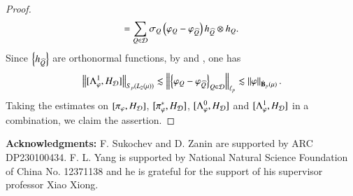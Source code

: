 \documentclass[leqno]{amsart}
\begin{document}
\begin{proof}
\begin{align*}
[\Lambda^{1}_{\varphi},H_{\D}]=
\sum_{Q\in\D}\sigma_{Q}\left(\varphi_{Q}-\varphi_{\wh{Q}}\right)h_{\wh{Q}}\otimes h_{Q}.
\end{align*}
Since $\left\{ h_{\widehat{Q}} \right\}$ are orthonormal functions, by  and , one has
\begin{align*}
\left\| [\Lambda^{1}_{\varphi},H_{{\mathcal D}}] \right\|_{S_{p}(L_{2}(\mu))}
\lesssim\left\| \left\{ \varphi_{Q}-\varphi_{\widehat{Q}} \right\}_{Q\in{\mathcal D}} \right\|_{\ell_{p}}
\lesssim\left\| \varphi \right\|_{\dot{\mathbf B}_{p}(\mu)}.
\end{align*}
Taking the estimates on $[\pi_{\varphi},H_{{\mathcal D}}]$, $[\pi_{\varphi}^{*},H_{{\mathcal D}}]$, $[\Lambda^{0}_{\varphi},H_{{\mathcal D}}]$ and $[\Lambda^{1}_{\varphi},H_{{\mathcal D}}]$ in a combination, we claim the assertion.

\end{proof}









{\bf Acknowledgments:} F. Sukochev and D. Zanin are supported by ARC DP230100434. 
F. L. Yang is supported by National Natural Science Foundation of China No. 12371138 and he is grateful for the support of his supervisor professor Xiao Xiong.















%



\end{document}
